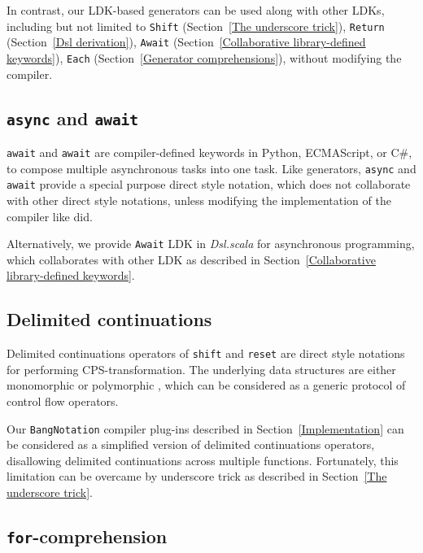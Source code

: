 In contrast, our LDK-based generators can be used along with other LDKs, including but not limited to \lstinline{Shift} (Section~\ref{The underscore trick}), \lstinline{Return} (Section~\ref{Dsl derivation}), \lstinline{Await} (Section~\ref{Collaborative library-defined keywords}), \lstinline{Each} (Section~\ref{Generator comprehensions}), without modifying the compiler.

\subsection{\lstinline{async} and \lstinline{await}}

\lstinline{await} and \lstinline{await} are compiler-defined keywords in Python, ECMAScript, or C\#, to compose multiple asynchronous tasks into one task. Like generators, \lstinline{async} and \lstinline{await} provide a special purpose direct style notation, which does not collaborate with other direct style notations, unless modifying the implementation of the compiler like \cite{pep525} did.

Alternatively, we provide \lstinline{Await} LDK in \textit{Dsl.scala} for asynchronous programming, which collaborates with other LDK as described in Section~\ref{Collaborative library-defined keywords}.

\subsection{Delimited continuations}

Delimited continuations operators of \lstinline{shift} and \lstinline{reset} \cite{Danvy1990AbstractingC} are direct style notations for performing CPS-transformation. The underlying data structures are either monomorphic \cite{danvy1989functional} or polymorphic \cite{asai2007polymorphic}, which can be considered as a generic protocol of control flow operators.

Our \lstinline{BangNotation} compiler plug-ins described in Section~\ref{Implementation} can be considered as a simplified version of delimited continuations operators, disallowing delimited continuations across multiple functions. Fortunately, this limitation can be overcame by underscore trick as described in Section~\ref{The underscore trick}.


\subsection{\lstinline{for}-comprehension}\label{for-comprehension}

